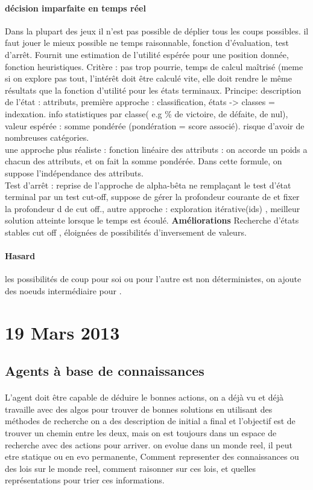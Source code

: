 \documentclass{article}
\begin{document}
\paragraph{décision imparfaite en temps réel} Dans la plupart des jeux il n'est pas possible de déplier tous les coups possibles. il faut jouer le mieux possible ne temps raisonnable, fonction d'évaluation, test d’arrêt. Fournit une estimation de l'utilité espérée pour une position donnée, fonction heuristiques. Critère : pas trop pourrie, temps de calcul maîtrisé (meme si on explore pas tout, l’intérêt doit être calculé vite, elle doit rendre le même résultats que la fonction d'utilité pour les états terminaux. Principe: description de l'état : attributs, première approche : classification, états -> classes = indexation. info statistiques par classe( e.g  \% de victoire, de défaite, de nul), valeur espérée : somme pondérée (pondération = score associé). risque d'avoir de nombreuses catégories. \\ une approche plus réaliste  : fonction linéaire des attributs : on accorde un poids a chacun des attributs, et on fait la somme pondérée. Dans cette formule, on suppose l’indépendance des attributs.\\ Test d’arrêt : reprise de l'approche de alpha-bêta ne remplaçant le test d'état terminal par un test cut-off, suppose de gérer la profondeur courante de et fixer la profondeur d de cut off., autre approche : exploration itérative(ids) , meilleur solution atteinte lorsque le temps est écoulé. \textbf{Améliorations} Recherche d'états stables cut off , éloignées de possibilités d’inversement de valeurs.

\paragraph{Hasard} les possibilités de coup pour soi ou pour l'autre est non déterministes, on ajoute des noeuds intermédiaire pour .

\section{19 Mars 2013}
\subsection{Agents à base de connaissances}
\paragraph{} L'agent doit être capable de  déduire le bonnes actions, on a déjà vu et déjà travaille avec des algos pour trouver de bonnes solutions en utilisant des méthodes de recherche on a des description de initial a final et l'objectif est de trouver un chemin entre les deux, mais on est toujours dans un espace de recherche avec des actions pour arriver. on evolue dans un monde reel, il peut etre statique ou en evo permanente, Comment representer des connaissances ou des lois sur le monde reel, comment raisonner sur ces lois, et quelles représentations pour trier ces informations.
\end{document}
